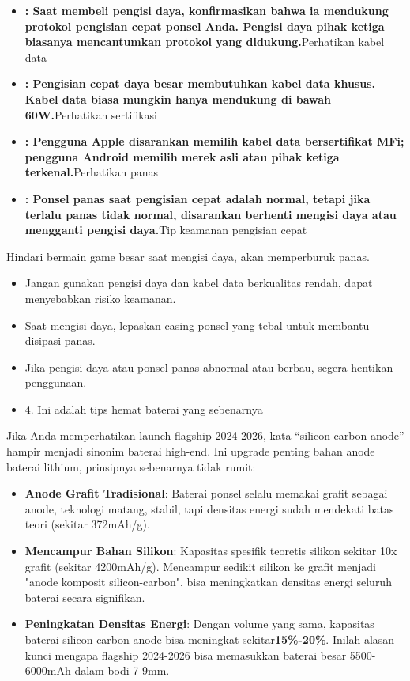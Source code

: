 
\begin{itemize}
  \item \textbf{: Saat membeli pengisi daya, konfirmasikan bahwa ia mendukung protokol pengisian cepat ponsel Anda. Pengisi daya pihak ketiga biasanya mencantumkan protokol yang didukung.}Perhatikan kabel data
  \item \textbf{: Pengisian cepat daya besar membutuhkan kabel data khusus. Kabel data biasa mungkin hanya mendukung di bawah 60W.}Perhatikan sertifikasi
  \item \textbf{: Pengguna Apple disarankan memilih kabel data bersertifikat MFi; pengguna Android memilih merek asli atau pihak ketiga terkenal.}Perhatikan panas
  \item \textbf{: Ponsel panas saat pengisian cepat adalah normal, tetapi jika terlalu panas tidak normal, disarankan berhenti mengisi daya atau mengganti pengisi daya.}Tip keamanan pengisian cepat
\end{itemize}

\begin{tcbwarn}{Hindari bermain game besar saat mengisi daya, akan memperburuk panas.}
\begin{itemize}
  \item Jangan gunakan pengisi daya dan kabel data berkualitas rendah, dapat menyebabkan risiko keamanan.
  \item Saat mengisi daya, lepaskan casing ponsel yang tebal untuk membantu disipasi panas.
  \item Jika pengisi daya atau ponsel panas abnormal atau berbau, segera hentikan penggunaan.
  \item 4. Ini adalah tips hemat baterai yang sebenarnya
\end{itemize}

\end{tcbwarn}


Jika Anda memperhatikan launch flagship 2024-2026, kata “silicon-carbon anode” hampir menjadi sinonim baterai high-end. Ini upgrade penting bahan anode baterai lithium, prinsipnya sebenarnya tidak rumit:

\begin{itemize}
  \item \textbf{Anode Grafit Tradisional}: Baterai ponsel selalu memakai grafit sebagai anode, teknologi matang, stabil, tapi densitas energi sudah mendekati batas teori (sekitar 372mAh/g).
  \item \textbf{Mencampur Bahan Silikon}: Kapasitas spesifik teoretis silikon sekitar 10x grafit (sekitar 4200mAh/g). Mencampur sedikit silikon ke grafit menjadi "anode komposit silicon-carbon", bisa meningkatkan densitas energi seluruh baterai secara signifikan.
  \item \textbf{Peningkatan Densitas Energi}: Dengan volume yang sama, kapasitas baterai silicon-carbon anode bisa meningkat sekitar\textbf{15\%-20\%}. Inilah alasan kunci mengapa flagship 2024-2026 bisa memasukkan baterai besar 5500-6000mAh dalam bodi 7-9mm.
\end{itemize}

